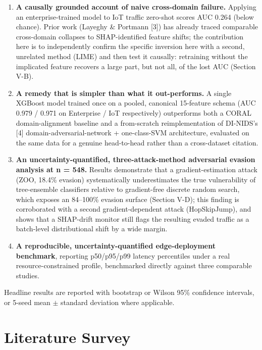 \documentclass[conference]{IEEEtran}
\begin{document}
\begin{enumerate}

\item \textbf{A causally grounded account of naive cross-domain failure.} Applying an enterprise-trained model to IoT traffic zero-shot scores AUC 0.264 (below chance). Prior work (Layeghy \& Portmann [3]) has already traced comparable cross-domain collapses to SHAP-identified feature shifts; the contribution here is to independently confirm the specific inversion here with a second, unrelated method (LIME) and then test it causally: retraining without the implicated feature recovers a large part, but not all, of the lost AUC (Section V-B).

\item \textbf{A remedy that is simpler than what it out-performs.} A single XGBoost model trained once on a pooled, canonical 15-feature schema (AUC 0.979 / 0.971 on Enterprise / IoT respectively) outperforms both a CORAL domain-alignment baseline and a from-scratch reimplementation of DI-NIDS's [4] domain-adversarial-network + one-class-SVM architecture, evaluated on the same data for a genuine head-to-head rather than a cross-dataset citation.

\item \textbf{An uncertainty-quantified, three-attack-method adversarial evasion analysis at n = 548.} Results demonstrate that a gradient-estimation attack (ZOO, 18.4\% evasion) systematically underestimates the true vulnerability of tree-ensemble classifiers relative to gradient-free discrete random search, which exposes an 84--100\% evasion surface (Section V-D); this finding is corroborated with a second gradient-dependent attack (HopSkipJump), and shows that a SHAP-drift monitor still flags the resulting evaded traffic as a batch-level distributional shift by a wide margin.

\item \textbf{A reproducible, uncertainty-quantified edge-deployment benchmark}, reporting p50/p95/p99 latency percentiles under a real resource-constrained profile, benchmarked directly against three comparable studies.

\end{enumerate}

Headline results are reported with bootstrap or Wilson 95\% confidence intervals, or 5-seed mean $\pm$ standard deviation where applicable.

\section{Literature Survey}
\end{document}
